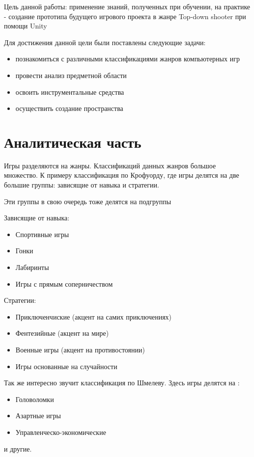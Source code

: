 \documentclass[14pt, titlepage,fleqn,a4paper]{extarticle}
\begin{document}
Цель данной работы: применение знаний, полученных при обучении, на практике - создание прототипа будущего игрового проекта в жанре Top-down shooter при помощи Unity

Для достижения данной цели были поставлены следующие задачи:
\begin{itemize}
\item познакомиться с различными классификациями жанров компьютерных игр 
\item провести анализ предметной области
\item освоить инструментальные средства
\item осуществить создание пространства
\end{itemize}
    \section*{Аналитическая часть}
	
	Игры разделяются на жанры. Классификаций данных жанров большое множество.
К примеру классификация по Крофуорду, где игры делятся на две большие группы: зависящие от навыка и стратегии.

	Эти группы в свою очередь тоже делятся на подгруппы

	Зависящие от навыка:
	\begin{itemize}
		\item Спортивные игры
		\item Гонки
		\item Лабиринты
		\item Игры с прямым соперничеством
	\end{itemize}

	Стратегии:
	\begin{itemize}
		\item Приключенчиские (акцент на самих приключениях)
		\item Фентезийные (акцент на мире)
		\item Военные игры (акцент на противостоянии)
		\item Игры основанные на случайности
	\end{itemize}

Так же интересно звучит классификация по Шмелеву.
Здесь игры делятся на :
\begin{itemize}
	\item Головоломки
	\item Азартные игры
	\item Управленческо-экономические
\end{itemize}
и другие.
\end{document}
